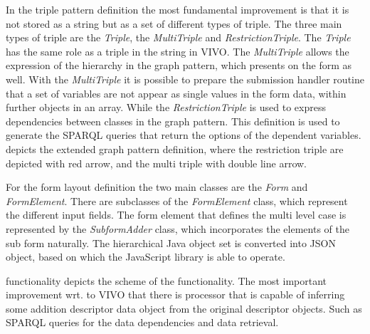 In the triple pattern definition the most fundamental improvement is that it is not stored as a string but as a set of different types of triple. The three main types of triple are the \textit{Triple}, the \textit{MultiTriple} and \textit{RestrictionTriple}. The \textit{Triple} has the same role as a triple in the string in VIVO. The \textit{MultiTriple} allows the expression of the hierarchy in the graph pattern, which presents on the form as well. With the \textit{MultiTriple} it is possible to prepare the submission handler routine that a set of variables are not appear as single values in the form data, within further objects in an array. While the \textit{RestrictionTriple} is used to express dependencies between classes in the graph pattern. This definition is used to generate the SPARQL queries that return the options of the dependent variables.  depicts the extended graph pattern definition, where the restriction triple are depicted with red arrow, and the multi triple with double line arrow.


For the form layout definition the two main classes are the \textit{Form} and \textit{FormElement}. There are subclasses of the \textit{FormElement} class, which represent the different input fields. The form element that defines the multi level case is represented by the \textit{SubformAdder} class, which incorporates the elements of the sub form naturally. The hierarchical Java object set is converted into JSON object, based on which the JavaScript library is able to operate. 

 functionality depicts the scheme of the functionality. The most important improvement wrt. to VIVO that there is processor that is capable of inferring some addition descriptor data object from the original descriptor objects. Such as SPARQL queries for the data dependencies and data retrieval.  

